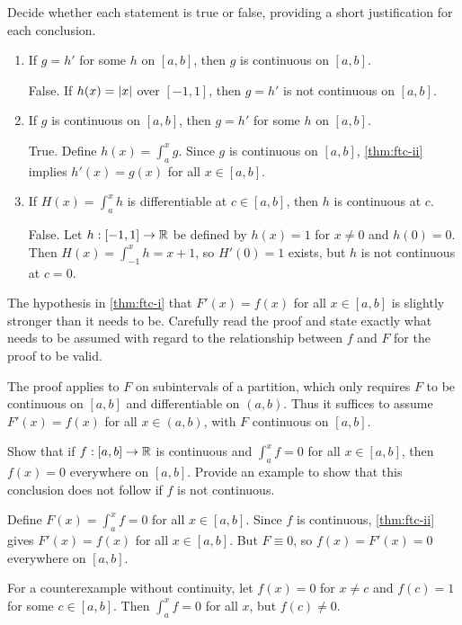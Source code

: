 \begin{problem}
  Decide whether each statement is true or false, providing a short justification
  for each conclusion.
  \begin{enumerate}[label=(\alph*)]
    \item If $g = h'$ for some $h$ on $[a, b]$, then $g$ is continuous on $[a, b]$.

      False. If $h(x) = \left\lvert x \right\rvert$ over $[-1, 1]$, then $g = h'$ is not continuous on 
      $[a,b]$.

    \item If $g$ is continuous on $[a, b]$, then $g = h'$ for some $h$ on $[a, b]$.

      True. Define $h(x) = \int_{a}^{x} g$. Since $g$ is continuous on $[a, b]$,
      \ref{thm:ftc-ii} implies $h'(x) = g(x)$ for all $x \in [a, b]$.

    \item If $H(x) = \int_{a}^{x} h$ is differentiable at $c \in [a, b]$, then $h$ is
      continuous at $c$.

      False. Let $h : [-1, 1] \to \mathbb{R}$ be defined by $h(x) = 1$ for $x \neq 0$ and
      $h(0) = 0$. Then $H(x) = \int_{-1}^{x} h = x + 1$, so $H'(0) = 1$ exists, but $h$
      is not continuous at $c = 0$.

  \end{enumerate}
\end{problem}

\begin{problem}
  The hypothesis in \ref{thm:ftc-i} that $F'(x) = f(x)$ for all
  $x \in [a, b]$ is slightly stronger than it needs to be. Carefully read the proof
  and state exactly what needs to be assumed with regard to the relationship between
  $f$ and $F$ for the proof to be valid.
  \vspace{\baselineskip}

  The proof applies  to $F$ on subintervals of a partition,
  which only requires $F$ to be continuous on $[a, b]$ and differentiable on $(a, b)$. Thus
  it suffices to assume $F'(x) = f(x)$ for all $x \in (a, b)$, with $F$ continuous on
  $[a, b]$.
\end{problem}

\begin{problem}
  Show that if $f : [a, b] \to \mathbb{R}$ is continuous and $\int_{a}^{x} f = 0$ for all
  $x \in [a, b]$, then $f(x) = 0$ everywhere on $[a, b]$. Provide an example to show
  that this conclusion does not follow if $f$ is not continuous.
  \vspace{\baselineskip}

  Define $F(x) = \int_{a}^{x} f = 0$ for all $x \in [a, b]$. Since $f$ is continuous,
  \ref{thm:ftc-ii} gives $F'(x) = f(x)$ for all $x \in [a, b]$. But
  $F \equiv 0$, so $f(x) = F'(x) = 0$ everywhere on $[a, b]$.

  For a counterexample without continuity, let $f(x) = 0$ for $x \neq c$ and $f(c) = 1$
  for some $c \in [a, b]$. Then $\int_{a}^{x} f = 0$ for all $x$, but $f(c) \neq 0$.
\end{problem}

